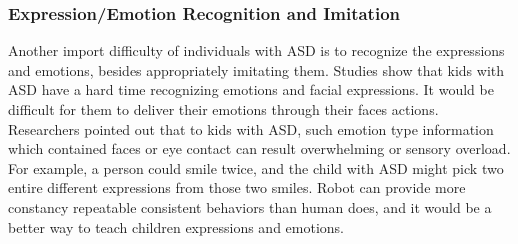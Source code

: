 \subsubsection{Expression/Emotion Recognition and Imitation}
Another import difficulty of individuals with ASD is to recognize the expressions and emotions, besides appropriately imitating them. Studies show that kids with ASD have a hard time recognizing emotions and facial expressions. It would be difficult for them to deliver their emotions through their faces actions. Researchers pointed out that to kids with ASD, such emotion type information which contained faces or eye contact can result overwhelming or sensory overload. For example, a person could smile twice, and the child with ASD might pick two entire different expressions from those two smiles. Robot can provide more constancy repeatable consistent behaviors than human does, and it would be a better way to teach children expressions and emotions.
